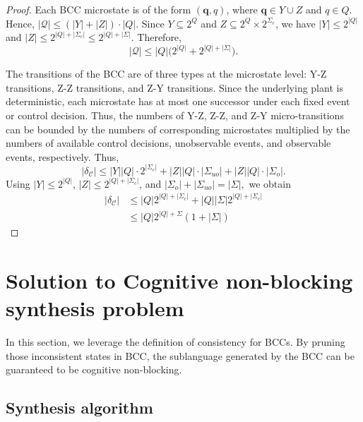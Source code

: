 \documentclass[journal,twoside,web]{ieeecolor}
\begin{document}
\begin{proof}
Each BCC microstate is of the form $(\bm{q},q)$, where
$\bm{q}\in Y\cup Z$ and $q\in Q$. Hence,
$
    |\bm{\mathcal{Q}}| \le (|Y|+|Z|)\cdot |Q|.
$
Since $Y\subseteq 2^Q$ and $Z\subseteq 2^Q\times 2^{\Sigma_c}$, we have
$
|Y|\le 2^{|Q|}
$
and
$
|Z|\le 2^{|Q|+|\Sigma_c|}
\le
2^{|Q|+|\Sigma|}.
$
Therefore,
$$
    |\bm{\mathcal{Q}}|
    \le
    |Q|\big(2^{|Q|}+2^{|Q|+|\Sigma|}\big).
$$

The transitions of the BCC are of three types at the microstate level:
Y-Z transitions, Z-Z transitions, and Z-Y transitions.
Since the underlying plant is deterministic, each microstate has at most
one successor under each fixed event or control decision.
Thus, the numbers of Y-Z, Z-Z, and Z-Y micro-transitions can be bounded by
the numbers of corresponding microstates multiplied by the numbers of
available control decisions, unobservable events, and observable events,
respectively.
Thus,
$$
    |\delta_{\mathcal{C}}|
    \le
    |Y||Q| \cdot 2^{|\Sigma_c|}
    +
    |Z||Q| \cdot |\Sigma_{uo}|
    +
    |Z||Q| \cdot |\Sigma_o|.
$$
Using
$
|Y|\le 2^{|Q|}
$,
$
|Z|\le 2^{|Q|+|\Sigma_c|}
$,
and
$
|\Sigma_o|+|\Sigma_{uo}|=|\Sigma|,
$
we obtain
$$
\begin{aligned}
|\delta_{\mathcal{C}}| 
&\leq |Q|2^{|Q| + |\Sigma_c|} + |Q||\Sigma|2^{|Q| + |\Sigma_c|} \\
&\leq |Q|2^{|Q| + \Sigma}(1 + |\Sigma|)
\end{aligned}
$$
\end{proof}



\section{Solution to Cognitive non-blocking synthesis problem}\label{sec:solu}
% 
% 
%

In this section, we leverage the definition of consistency for BCCs.
By pruning those inconsistent states in BCC, the sublanguage generated by the BCC can be guaranteed to be cognitive non-blocking.
%

\subsection{Synthesis algorithm}\label{subsec:supervisor_induction}
\end{document}
